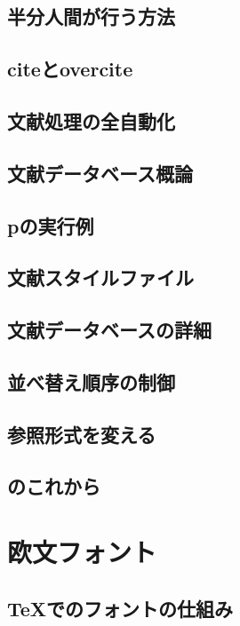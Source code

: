 \documentclass{jsbook}
\begin{document}
\section{半分人間が行う方法}

\section{citeとovercite}

\section{文献処理の全自動化}

\section{文献データベース概論}

\section{p\BibTeX の実行例}

\section{文献スタイルファイル}

\section{文献データベースの詳細}

\section{並べ替え順序の制御}

\section{参照形式を変える}

\section{\BibTeX のこれから}

\chapter{欧文フォント}

\section{\TeX でのフォントの仕組み}
\end{document}
